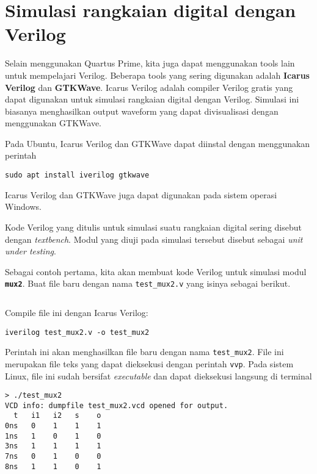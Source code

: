 \section{Simulasi rangkaian digital dengan Verilog}

Selain menggunakan Quartus Prime, kita juga dapat menggunakan tools lain untuk
mempelajari Verilog. Beberapa tools yang sering digunakan
adalah \textbf{Icarus Verilog} dan \textbf{GTKWave}. Icarus
Verilog adalah compiler Verilog gratis yang dapat digunakan
untuk simulasi rangkaian digital dengan Verilog. Simulasi ini
biasanya menghasilkan output waveform yang dapat divisualisasi dengan
menggunakan GTKWave.

Pada Ubuntu, Icarus Verilog dan GTKWave dapat diinstal dengan menggunakan perintah
\begin{verbatim}
sudo apt install iverilog gtkwave
\end{verbatim}
Icarus Verilog dan GTKWave juga dapat digunakan pada sistem operasi Windows.

Kode Verilog yang ditulis untuk simulasi suatu rangkaian digital sering
disebut dengan \textit{textbench}. Modul yang diuji pada simulasi tersebut
disebut sebagai \textit{unit under testing}.

Sebagai contoh pertama, kita akan membuat kode Verilog untuk simulasi
modul {\tt\textbf{mux2}}. Buat file baru dengan nama {\tt test\_mux2.v}
yang isinya sebagai berikut.
\begin{mdframed}[backgroundcolor=mintedbg]
{
\inputminted[breaklines,fontsize=\small]{verilog}{codes/test_mux2.v}
}\end{mdframed}

Compile file ini dengan Icarus Verilog:
\begin{verbatim}
iverilog test_mux2.v -o test_mux2
\end{verbatim}

Perintah ini akan menghasilkan file baru dengan nama {\tt\small test\_mux2}.
File ini merupakan file teks yang dapat dieksekusi dengan perintah {\tt vvp}.
Pada sistem Linux, file ini sudah bersifat \textit{executable} dan dapat dieksekusi
langsung di terminal
\begin{verbatim}
> ./test_mux2
VCD info: dumpfile test_mux2.vcd opened for output.
  t   i1   i2   s    o
0ns   0    1    1    1
1ns   1    0    1    0
3ns   1    1    1    1
7ns   0    1    0    0
8ns   1    1    0    1
\end{verbatim}


